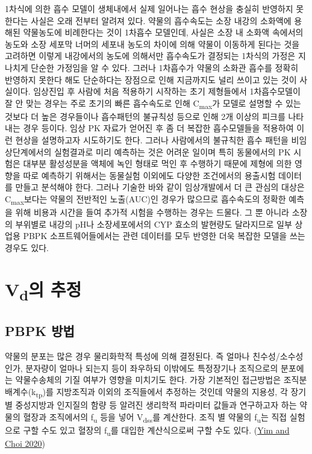 \documentclass[
  11pt,
  krantz2, a4paper, twoside]{krantz}
\begin{document}
1차식에 의한 흡수 모델이 생체내에서 실제 일어나는 흡수 현상을 충실히 반영하지 못한다는 사실은 오래 전부터 알려져 있다. 약물의 흡수속도는 소장 내강의 소화액에 용해된 약물농도에 비례한다는 것이 1차흡수 모델인데, 사실은 소장 내 소화액 속에서의 농도와 소장 세포막 너머의 세포내 농도의
차이에 의해 약물이 이동하게 된다는 것을 고려하면 이렇게 내강에서의
농도에 의해서만 흡수속도가 결정되는 1차식의 가정은 지나치게 단순한
가정임을 알 수 있다. 그러나 1차흡수가 약물의 소화관 흡수를 정확히
반영하지 못한다 해도 단순하다는 장점으로 인해 지금까지도 널리 쓰이고
있는 것이 사실이다. 임상진입 후 사람에 처음 적용하기 시작하는 초기
제형들에서 1차흡수모델이 잘 안 맞는 경우는 주로 초기의 빠른 흡수속도로
인해 C\textsubscript{max}가 모델로 설명할 수 있는 것보다 더 높은 경우들이나 흡수패턴의
불규칙성 등으로 인해 2개 이상의 피크를 나타내는 경우 등이다. 임상 PK
자료가 얻어진 후 좀 더 복잡한 흡수모델들을 적용하여 이런 현상을
설명하고자 시도하기도 한다. 그러나 사람에서의 불규칙한 흡수 패턴을
비임상단계에서의 실험결과로 미리 예측하는 것은 어려운 일이며 특히
동물에서의 PK 시험은 대부분 활성성분을 액체에 녹인 형태로 먹인 후
수행하기 때문에 제형에 의한 영향을 따로 예측하기 위해서는 동물실험
이외에도 다양한 조건에서의 용출시험 데이터를 만들고 분석해야 한다.
그러나 기술한 바와 같이 임상개발에서 더 큰 관심의 대상은 C\textsubscript{max}보다는
약물의 전반적인 노출(AUC)인 경우가 많으므로 흡수속도의 정확한 예측을
위해 비용과 시간을 들여 추가적 시험을 수행하는 경우는 드물다. 그 뿐
아니라 소장의 부위별로 내강의 pH나 소장세포에서의 CYP 효소의 발현량도
달라지므로 일부 상업용 PBPK 소프트웨어들에서는 관련 데이터를 모두 반영한
더욱 복잡한 모델을 쓰는 경우도 있다.

\hypertarget{vduxc758-uxcd94uxc815}{%
\section{\texorpdfstring{V\textsubscript{d}의 추정}{Vd의 추정}}\label{vduxc758-uxcd94uxc815}}

\hypertarget{pbpk-uxbc29uxbc95}{%
\subsection{PBPK 방법}\label{pbpk-uxbc29uxbc95}}

약물의 분포는 많은 경우 물리화학적 특성에 의해 결정된다. 즉 얼마나
친수성/소수성인가, 분자량이 얼마나 되는지 등이 좌우하되 이밖에도
특정장기나 조직으로의 분포에는 약물수송체의 기질 여부가 영향을 미치기도
한다. 가장 기본적인 접근방법은 조직분배계수(k\textsubscript{tp})를 지방조직과 이외의
조직들에서 추정하는 것인데 약물의 지용성, 각 장기별 중성지방과 인지질의
함량 등 알려진 생리학적 파라미터 값들과 연구하고자 하는 약물의 혈장과
조직에서의 f\textsubscript{u} 등을 넣어 V\textsubscript{dss}를 계산한다. 조직 별 약물의 f\textsubscript{u}는 직접
실험으로 구할 수도 있고 혈장의 f\textsubscript{u}를 대입한 계산식으로써 구할 수도
있다. (\protect\hyperlink{ref-yim2020predicting}{Yim and Choi 2020})
\end{document}
